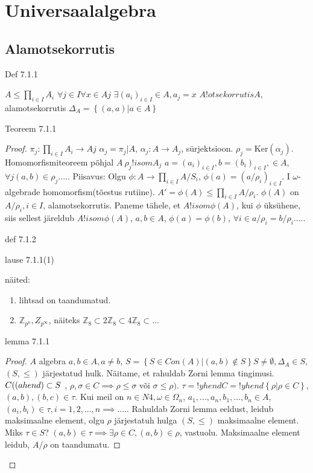 \documentclass[12pt]{report}
\numberwithin{equation}{section}
\theoremstyle{definition}
\theoremstyle{plain}
\begin{document}
\section{Universaalalgebra}
\subsection{Alamotsekorrutis}
Def 7.1.1

$A \leq \prod \limits_{i \in I} A_i$
$\forall j \in I \forall x \in Aj$
$\exists (a_i)_{i \in I} \in A, a_j = x$
$A !otsekorrutis A$, alamotsekorrutis $\Delta_A = \left\lbrace (a,a) | a \in A \right\rbrace$

Teoreem 7.1.1

\begin{proof}
$\pi_j : \prod_{i \in I} A_i \to Aj$
$\alpha_j = \pi_j | A$, $\alpha_j: A \to A_j$, sürjektsioon.
$\rho_j = \text{Ker}(\alpha_j)$. 
Homomorfismiteoreem põhjal $A \ \rho_j !isom A_j$
$a = (a_i)_{i \in I}, b = (b_i)_{i \in I}, \in A$, $\forall j (a,b) \in \rho_j$.....
Piisavus: Olgu $\phi: A \to \prod \limits_{i \in I} A / S_i$, $\phi(a) = (a / \rho_i)_{i \in I}$. I $\omega$- algebrade homomorfism(tõestus rutiine). $A' = \phi(A) \leq \prod_{i \in I} A / \rho_i $. $\phi(A)$ on $A/ \rho_i, i \in I$, alamotsekorrutis. Paneme tähele, et $A !isom \phi(A)$, kui $\phi$ \"uks\"uhene, siis sellest järeldub $A !isom \phi(A)$, $a,b \in A$, $\phi(a) = \phi(b)$, $\forall i \in a/ \rho_i =b / \rho_i$.....

def 7.1.2

lause 7.1.1(1)

näited:
\begin{enumerate}
\item lihtsad on taandumatud.
\item $\mathbb{Z}_{p^n}, Z_{p^\infty}$, näiteks $\mathbb{Z}_8  \subset 2 \mathbb{Z}_{8} \subset 4 \mathbb{Z}_8 \subset ...$
\end{enumerate}

lemma 7.1.1

\begin{proof}
$A$ algebra
$a,b \in A, a \neq b$,
$S = \left\lbrace S \in Con(A) | (a,b) \not \in S \right\rbrace
S \neq \emptyset, \Delta_A \in S$, $(S, \leq) $ järjestatud hulk. Näitame, et rahuldab Zorni lemma tingimusi. $C (\text(ahend) \subset S$ , $\rho,\sigma \in C \implies \rho \leq \sigma $ või $ \sigma \leq \rho)$. $\tau = !yhendC = !yhend \left\lbrace \rho | \rho \in C \right\rbrace$, $(a,b),(b,c) \in \tau$. Kui meil on $n \in N4, \omega \in \Omega_n$, $a_1,...,a_n,b_1,...,b_n \in A$, $(a_i, b_i ) \in \tau, i = 1,2,...,n \implies ....$. Rahuldab Zorni lemma eeldust, leidub maksimaalne element, olgu $\rho$ järjestatuh hulga $(S,\leq)$ maksimaalne element. Miks $\tau \in S$? $(a,b) \in \tau \implies \exists \rho \in C, (a,b) \in \rho$, vastuolu. 
Maksimaalne element leidub, $A/ \rho $ on taandumatu. 

\end{proof}

\end{proof}
\end{document}
